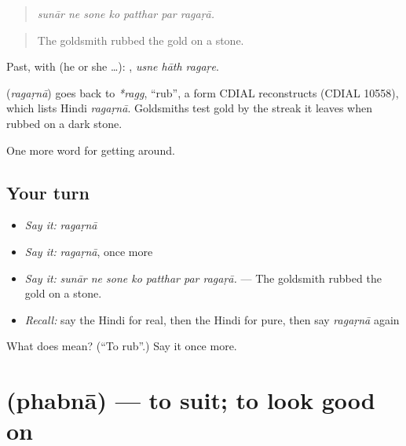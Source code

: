 \begin{quote}
      
\end{quote}

\begin{quote}
\emph{sunār ne sone ko patthar par ragaṛā.}
\end{quote}

\begin{quote}
The goldsmith rubbed the gold on a stone.
\end{quote}

Past, with  (he or she …):   , \emph{usne hāth ragaṛe}.

\begin{cousinweb}
\textbf{} (\emph{ragaṛnā}) goes back to \emph{*ragg}, \textquotedblleft{}rub\textquotedblright{}, a form CDIAL reconstructs (CDIAL 10558), which lists Hindi \emph{ragaṛnā}. Goldsmiths test gold by the streak it leaves when rubbed on a dark stone.
\end{cousinweb}

\begin{grammarlens}[title={What you've built}]
One more word for getting around.
\end{grammarlens}

\subsection*{Your turn}
\begin{itemize}
\raggedright
  \item \emph{Say it:} \emph{ragaṛnā}
  \item \emph{Say it:} \emph{ragaṛnā}, once more
  \item \emph{Say it:} \emph{sunār ne sone ko patthar par ragaṛā.} — The goldsmith rubbed the gold on a stone.
  \item \emph{Recall:} say the Hindi for real, then the Hindi for pure, then say \emph{ragaṛnā} again
\end{itemize}

\begin{tcolorbox}[breakable,colback=teal!4,colframe=teal!35!black,title={Before you move on}]
What does  mean? (\textquotedblleft{}To rub\textquotedblright{}.) Say it once more.
\end{tcolorbox}
\section[\texorpdfstring{\hi{फबना} (phabnā)}{फबना (phabnā)}]{ (phabnā) — to suit; to look good on}

